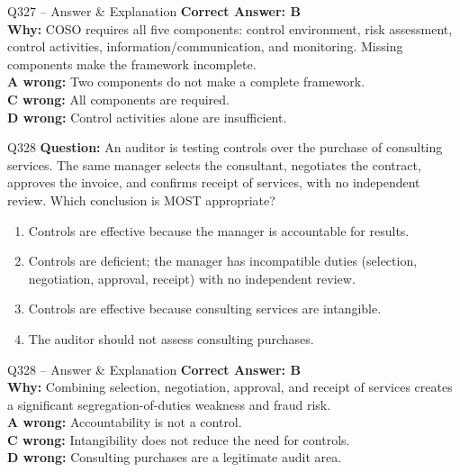 \documentclass[aspectratio=169,10pt]{beamer}
\begin{document}
	\begin{frame}[t]{Q327 -- Answer \& Explanation}
		\small
		\textbf{Correct Answer: B} \\[4pt]
		\textbf{Why:} COSO requires all five components: control environment, risk assessment, control activities, information/communication, and monitoring. Missing components make the framework incomplete. \\[4pt]
		\textbf{A wrong:} Two components do not make a complete framework. \\[2pt]
		\textbf{C wrong:} All components are required. \\[2pt]
		\textbf{D wrong:} Control activities alone are insufficient.
	\end{frame}
	
	\begin{frame}[t]{Q328}
		\small
		\textbf{Question:} An auditor is testing controls over the purchase of consulting services. The same manager selects the consultant, negotiates the contract, approves the invoice, and confirms receipt of services, with no independent review. Which conclusion is MOST appropriate?
		\begin{enumerate}[label=\Alph*.,itemsep=1pt,topsep=2pt]
			\item Controls are effective because the manager is accountable for results.
			\item Controls are deficient; the manager has incompatible duties (selection, negotiation, approval, receipt) with no independent review.
			\item Controls are effective because consulting services are intangible.
			\item The auditor should not assess consulting purchases.
		\end{enumerate}
	\end{frame}
	
	\begin{frame}[t]{Q328 -- Answer \& Explanation}
		\small
		\textbf{Correct Answer: B} \\[4pt]
		\textbf{Why:} Combining selection, negotiation, approval, and receipt of services creates a significant segregation-of-duties weakness and fraud risk. \\[4pt]
		\textbf{A wrong:} Accountability is not a control. \\[2pt]
		\textbf{C wrong:} Intangibility does not reduce the need for controls. \\[2pt]
		\textbf{D wrong:} Consulting purchases are a legitimate audit area.
	\end{frame}
	
\end{document}
